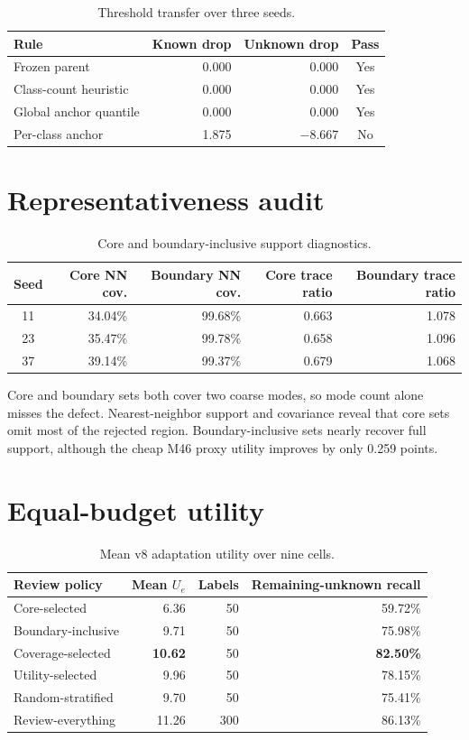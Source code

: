 \documentclass[12pt,oneside]{report}
\newcommand{\utility}{U}
\begin{document}
\begin{table}[ht]
\centering
\caption{Threshold transfer over three seeds.}
\label{tab:threshold}
\begin{tabular}{lrrc}
\toprule
Rule & Known drop & Unknown drop & Pass\\
\midrule
Frozen parent & 0.000 & 0.000 & Yes\\
Class-count heuristic & 0.000 & 0.000 & Yes\\
Global anchor quantile & 0.000 & 0.000 & Yes\\
Per-class anchor & 1.875 & $-8.667$ & No\\
\bottomrule
\end{tabular}
\end{table}

\section{Representativeness audit}

\begin{table}[ht]
\centering
\caption{Core and boundary-inclusive support diagnostics.}
\label{tab:coverage}
\small
\begin{tabular}{crrrr}
\toprule
Seed & Core NN cov. & Boundary NN cov. & Core trace ratio & Boundary trace ratio\\
\midrule
11 & 34.04\% & 99.68\% & 0.663 & 1.078\\
23 & 35.47\% & 99.78\% & 0.658 & 1.096\\
37 & 39.14\% & 99.37\% & 0.679 & 1.068\\
\bottomrule
\end{tabular}
\end{table}

Core and boundary sets both cover two coarse modes, so mode count alone misses
the defect. Nearest-neighbor support and covariance reveal that core sets omit
most of the rejected region. Boundary-inclusive sets nearly recover full
support, although the cheap M46 proxy utility improves by only 0.259 points.

\section{Equal-budget utility}

\begin{table}[ht]
\centering
\caption{Mean v8 adaptation utility over nine cells.}
\label{tab:utility}
\begin{tabular}{lrrr}
\toprule
Review policy & Mean $\utility_e$ & Labels & Remaining-unknown recall\\
\midrule
Core-selected & 6.36 & 50 & 59.72\%\\
Boundary-inclusive & 9.71 & 50 & 75.98\%\\
Coverage-selected & \textbf{10.62} & 50 & \textbf{82.50\%}\\
Utility-selected & 9.96 & 50 & 78.15\%\\
Random-stratified & 9.70 & 50 & 75.41\%\\
Review-everything & 11.26 & 300 & 86.13\%\\
\bottomrule
\end{tabular}
\end{table}
\end{document}
